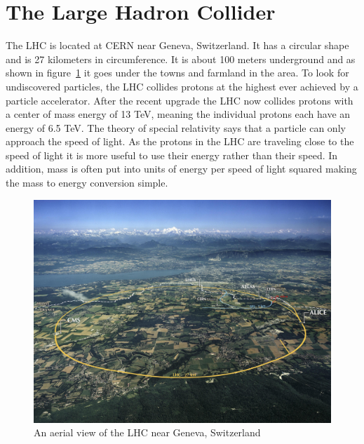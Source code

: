 
\section{The Large Hadron Collider}

The LHC is located at CERN near Geneva, Switzerland. It has a circular shape and is 27 kilometers in circumference. It is about 100 meters underground and as shown in figure~\ref{fig:LHC} it goes under the towns and farmland in the area. To look for undiscovered particles, the LHC collides protons at the highest ever achieved by a particle accelerator. After the recent upgrade the LHC now collides protons with a center of mass energy of 13 TeV, meaning the individual protons each have an energy of 6.5 TeV. The theory of special relativity says that a particle can only approach the speed of light. As the protons in the LHC are traveling close to the speed of light it is more useful to use their energy rather than their speed. In addition, mass is often put into units of energy per speed of light squared making the mass to energy conversion simple. 

\begin{figure}
\centering
\includegraphics[width=0.8\linewidth]{Figures/LHC.jpg}
\caption{An aerial view of the LHC near Geneva, Switzerland~\cite{LHC_view}}
\label{fig:LHC}
\end{figure}

